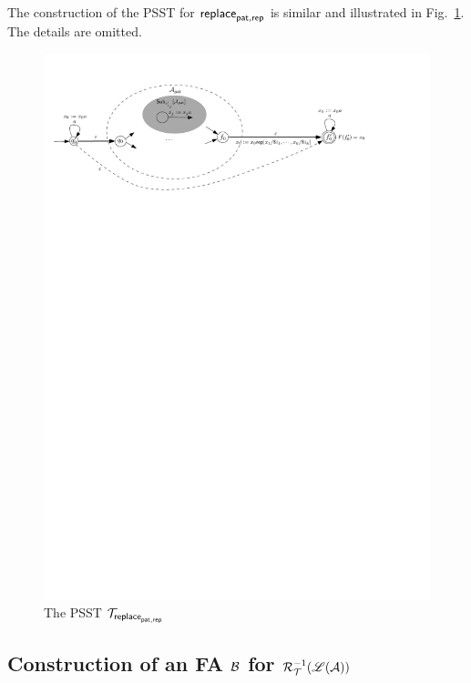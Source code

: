         The construction of the PSST for $\mathsf{replace}_{\mathsf{pat}, \mathsf{rep}}$ is similar and illustrated in Fig.~\ref{fig-psst-replace}. The details are omitted.
        \begin{figure}[ht]
            \centering
            \includegraphics[width=\textwidth]{psst-replace.pdf}
            \caption{The PSST $\mathcal{T}_{\mathsf{replace}_{\mathsf{pat},\mathsf{rep}}}$}
            \label{fig-psst-replace}
        \end{figure}


        \subsection{Construction of an FA $\mathcal{B}$ for $\mathcal{R}^{-1}_{\mathcal{T}}(\mathscr{L}(\mathcal{A}))$}\label{app-pre-image}


